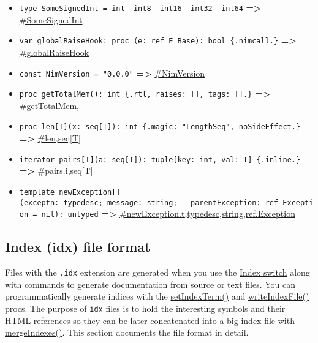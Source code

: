 \begin{itemize}
\tightlist
\item
  \texttt{type\ SomeSignedInt\ =\ int\ \textbar{}\ int8\ \textbar{}\ int16\ \textbar{}\ int32\ \textbar{}\ int64}
  \textbf{=\textgreater{}}
  \href{system.html\#SomeSignedInt}{\#SomeSignedInt}
\item
  \texttt{var\ globalRaiseHook:\ proc\ (e:\ ref\ E\_Base):\ bool\ \{.nimcall.\}}
  \textbf{=\textgreater{}}
  \href{system.html\#globalRaiseHook}{\#globalRaiseHook}
\item
  \texttt{const\ NimVersion\ =\ "0.0.0"} \textbf{=\textgreater{}}
  \href{system.html\#NimVersion}{\#NimVersion}
\item
  \texttt{proc\ getTotalMem():\ int\ \{.rtl,\ raises:\ {[}{]},\ tags:\ {[}{]}.\}}
  \textbf{=\textgreater{}}
  \href{system.html\#getTotalMem}{\#getTotalMem,}
\item
  \texttt{proc\ len{[}T{]}(x:\ seq{[}T{]}):\ int\ \{.magic:\ "LengthSeq",\ noSideEffect.\}}
  \textbf{=\textgreater{}}
  \href{system.html\#len,seq\%5BT\%5D}{\#len,seq{[}T{]}}
\item
  \texttt{iterator\ pairs{[}T{]}(a:\ seq{[}T{]}):\ tuple{[}key:\ int,\ val:\ T{]}\ \{.inline.\}}
  \textbf{=\textgreater{}}
  \href{system.html\#pairs.i,seq\%5BT\%5D}{\#pairs.i,seq{[}T{]}}
\item
  \texttt{template\ newException{[}{]}(exceptn:\ typedesc;\ message:\ string;\ \ \ parentException:\ ref\ Exception\ =\ nil):\ untyped}
  \textbf{=\textgreater{}}
  \href{system.html\#newException.t,typedesc,string,ref.Exception}{\#newException.t,typedesc,string,ref.Exception}
\end{itemize}

\hypertarget{index-idx-file-format}{%
\subsection{Index (idx) file format}\label{index-idx-file-format}}

Files with the \texttt{.idx} extension are generated when you use the
\protect\hyperlink{related-options-index-switch}{Index switch} along
with commands to generate documentation from source or text files. You
can programmatically generate indices with the
\href{rstgen.html\#setIndexTerm,RstGenerator,string,string,string,string,string}{setIndexTerm()}
and
\href{rstgen.html\#writeIndexFile,RstGenerator,string}{writeIndexFile()}
procs. The purpose of \texttt{idx} files is to hold the interesting
symbols and their HTML references so they can be later concatenated into
a big index file with
\href{rstgen.html\#mergeIndexes,string}{mergeIndexes()}. This section
documents the file format in detail.

